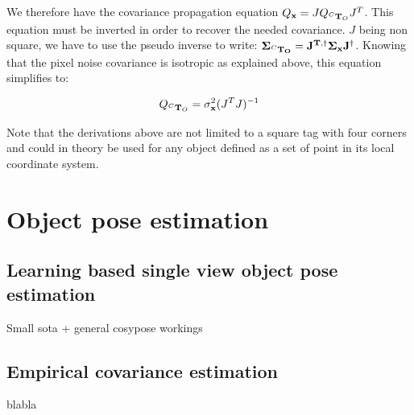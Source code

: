 We therefore have the covariance propagation equation $Q_{{\bf x}} = J Q_{\prescript{C}{}{{\bf T}}_{O}} J^T$. 
This equation must be inverted in order to recover the needed covariance. $J$ being non square, 
we have to use the pseudo inverse to write: $\bf \Sigma_{\prescript{C}{}{{\bf T}}_{O}} = J^{T,\dagger} \bf \Sigma_{{\bf x}} J^{\dagger}$. 
Knowing that the pixel noise covariance is isotropic as explained above, this equation simplifies to:

\begin{equation}
Q_{\prescript{C}{}{{\bf T}}_{O}} = \sigma_{{\bf x}}^2(J^T J)^{-1}    
\end{equation}

Note that the derivations above are not limited to a square tag with four corners and could in theory be used for any object defined as
a set of point in its local coordinate system.





\section{Object pose estimation}
\subsection{Learning based single view object pose estimation}
Small sota + general cosypose workings
\subsection{Empirical covariance estimation}
blabla